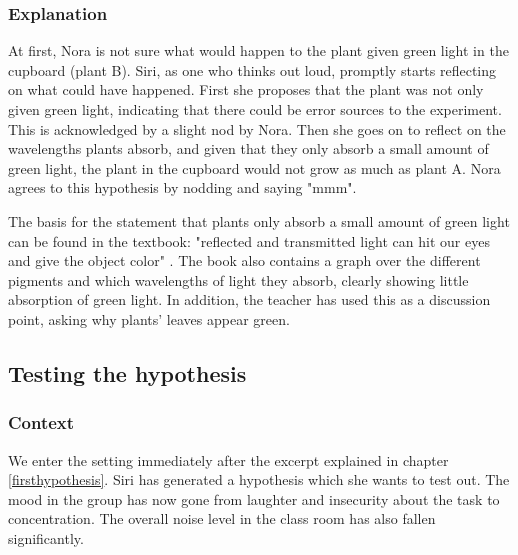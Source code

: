 \subsubsection*{Explanation}
At first, Nora is not sure what would happen to the plant given green light in the cupboard (plant B). Siri, as one who thinks out loud, promptly starts reflecting on what could have happened. First she proposes that the plant was not only given green light, indicating that there could be error sources to the experiment. This is acknowledged by a slight nod by Nora. Then she goes on to reflect on the wavelengths plants absorb, and given that they only absorb a small amount of green light, the plant in the cupboard would not grow as much as plant A. Nora agrees to this hypothesis by nodding and saying "mmm". 

The basis for the statement that plants only absorb a small amount of green light can be found in the textbook: "reflected and transmitted light can hit our eyes and give the object color" \citep[pg. 103]{bios}. The book also contains a graph over the different pigments and which wavelengths of light they absorb, clearly showing little absorption of green light. In addition, the teacher has used this as a discussion point, asking why plants' leaves appear green. 

\subsection{Testing the hypothesis}

\subsubsection*{Context}
We enter the setting immediately after the excerpt explained in chapter \ref{firsthypothesis}. Siri has generated a hypothesis which she wants to test out. The mood in the group has now gone from laughter and insecurity about the task to concentration. The overall noise level in the class room has also fallen significantly. 

